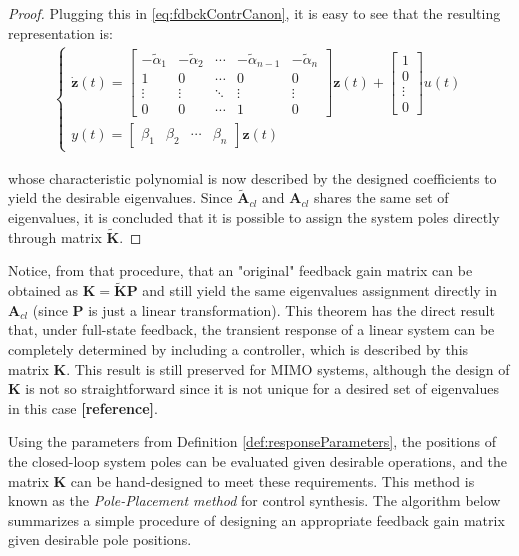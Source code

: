 \documentclass[a4paper,11pt]{book}
\numberwithin{figure}{chapter}
\numberwithin{equation}{chapter}
\numberwithin{table}{chapter}
\theoremstyle{definition}
\begin{document}
\begin{proof}
	Plugging this in \eqref{eq:fdbckContrCanon}, it is easy to see that the resulting representation is:
	\begin{align}
	\begin{cases}
		\dot{\bm{z}}(t) = \begin{bmatrix}
			-\tilde{\alpha}_1 & -\tilde{\alpha}_2 & \cdots & -\tilde{\alpha}_{n-1} & -\tilde{\alpha}_n \\
			1 & 0 & \cdots & 0 & 0 \\
			\vdots & \vdots & \ddots & \vdots & \vdots \\
			0 & 0 & \cdots & 1 & 0 
		\end{bmatrix} \bm{z}(t) + \begin{bmatrix}
			1 \\ 0 \\ \vdots \\ 0
		\end{bmatrix} u(t) \\
		y(t) = \begin{bmatrix} \beta_1 & \beta_2 & \cdots & \beta_n \end{bmatrix} \bm{z}(t)
	\end{cases}
	\end{align} 
	
	\noindent whose characteristic polynomial is now described by the designed coefficients to yield the desirable eigenvalues. Since $\tilde{\bm{A}}_{cl}$ and $\bm{A}_{cl}$ shares the same set of eigenvalues, it is concluded that it is possible to assign the system poles directly through matrix $\tilde{\bm{K}}$.
\end{proof}

Notice, from that procedure, that an "original" feedback gain matrix can be obtained as $\bm{K} = \tilde{\bm{K}} \bm{P}$ and still yield the same eigenvalues assignment directly in $\bm{A}_{cl}$ (since $\bm{P}$ is just a linear transformation). This theorem has the direct result that, under full-state feedback, the transient response of a linear system can be completely determined by including a controller, which is described by this matrix $\bm{K}$. This result is still preserved for MIMO systems, although the design of $\bm{K}$ is not so straightforward since it is not unique for a desired set of eigenvalues in this case \textbf{[reference]}. 

Using the parameters from Definition \ref{def:responseParameters}, the positions of the closed-loop system poles can be evaluated given desirable operations, and the matrix $\bm{K}$ can be hand-designed to meet these requirements. This method is known as the \textit{Pole-Placement method} for control synthesis. The algorithm below summarizes a simple procedure of designing an appropriate feedback gain matrix given desirable pole positions.
\end{document}

